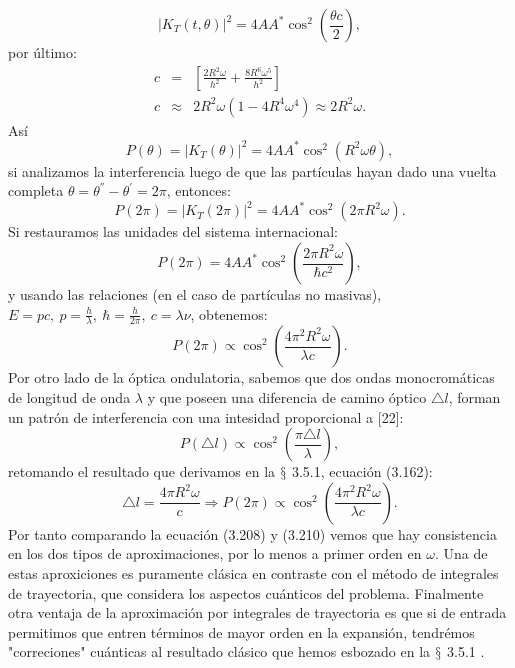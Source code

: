 \begin{equation}
|K_{T}(t,\theta)|^{2}=4AA^{*}\cos^{2}\left(\frac{\theta c}{2}\right),
\end{equation}
por último:
\begin{eqnarray}
\nonumber c&=&\left[\frac{2R^{2}\omega}{h^{2}}+\frac{8R^{6}\omega^{5}}{h^{2}}\right]\\
\nonumber c&\approx &  2R^{2}\omega(1-4R^{4}\omega^{4})\approx2R^{2}\omega .
\end{eqnarray}
Así 
\begin{equation}
P(\theta)=|K_{T}(\theta)|^{2}=4AA^{*}\cos^{2}(R^{2}\omega\theta),
\end{equation}
si analizamos la interferencia luego de que las partículas hayan dado una vuelta completa $\theta=\theta^{''}-\theta^{'}=2\pi$, entonces:
\begin{equation}
P(2\pi)=|K_{T}(2\pi)|^{2}=4AA^{*}\cos^{2}(2\pi R^{2}\omega).
\end{equation}
Si restauramos las unidades del sistema internacional:
\begin{equation}
P(2\pi)=4AA^{*}\cos^{2}\left(\frac{2\pi R^{2}\omega}{\hbar c^{2}}\right),
\end{equation}
y usando las relaciones (en el caso de partículas no masivas), $E=pc,\ p=\frac{h}{\lambda},\ \hbar=\frac{h}{2\pi},\ c=\lambda \nu$, obtenemos:
\begin{equation}
P(2\pi)\propto\cos^{2}\left(\frac{4\pi^{2}R^{2}\omega}{\lambda c}\right).
\end{equation}
Por otro lado de la óptica ondulatoria, sabemos que dos ondas monocromáticas de longitud de onda $\lambda$ 	y que poseen una diferencia de camino óptico $\triangle l$, forman un patrón de interferencia con una intesidad proporcional a [22]:
\begin{equation}
P(\triangle l)\propto\cos^{2}\left(\frac{\pi\triangle l}{\lambda}\right),
\end{equation} 
retomando el resultado que derivamos en la $\mathsection$ 3.5.1, ecuación (3.162):
\begin{equation}
\triangle l=\frac{4\pi R^{2}\omega}{c}\Rightarrow P(2\pi)\propto\cos^{2}\left(\frac{4\pi^{2}R^{2}\omega}{\lambda c}\right).
\end{equation}
Por tanto comparando la ecuación (3.208) y (3.210) vemos que hay consistencia en los dos tipos de aproximaciones, por lo menos a primer orden en $\omega$. Una de estas aproxiciones es puramente clásica en contraste con el método de integrales de trayectoria, que considera los aspectos cuánticos del problema. Finalmente otra ventaja de la aproximación por integrales de trayectoria es que si de entrada permitimos que entren términos de mayor orden en la expansión, tendrémos "correciones" cuánticas al resultado clásico que hemos esbozado en la $\mathsection$ 3.5.1 . 
 





